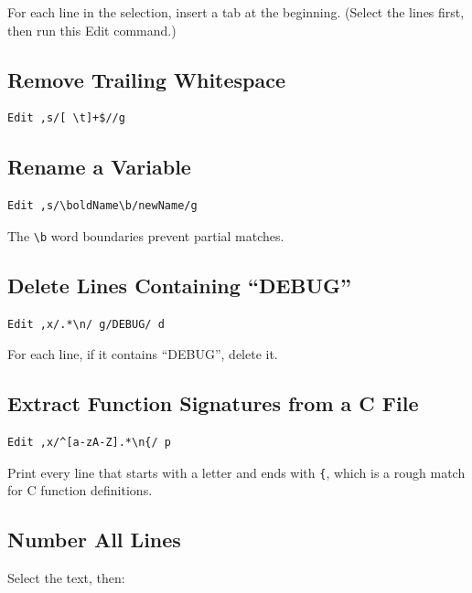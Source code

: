 \noindent
For each line in the selection, insert a tab at the beginning.  (Select
the lines first, then run this Edit command.)

\subsection{Remove Trailing Whitespace}

\begin{Verbatim}[frame=single]
Edit ,s/[ \t]+$//g
\end{Verbatim}

\subsection{Rename a Variable}

\begin{Verbatim}[frame=single]
Edit ,s/\boldName\b/newName/g
\end{Verbatim}

\noindent
The \texttt{\textbackslash b} word boundaries prevent partial matches.

\subsection{Delete Lines Containing ``DEBUG''}

\begin{Verbatim}[frame=single]
Edit ,x/.*\n/ g/DEBUG/ d
\end{Verbatim}

\noindent
For each line, if it contains ``DEBUG'', delete it.

\subsection{Extract Function Signatures from a C File}

\begin{Verbatim}[frame=single]
Edit ,x/^[a-zA-Z].*\n{/ p
\end{Verbatim}

\noindent
Print every line that starts with a letter and ends with \texttt{\{},
which is a rough match for C function definitions.

\subsection{Number All Lines}

Select the text, then:


